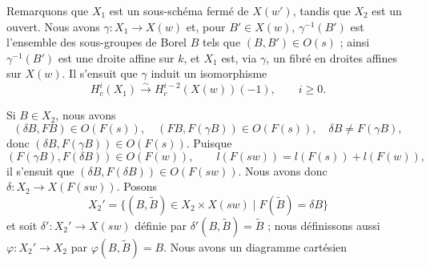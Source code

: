 \documentclass[9pt,twoside]{extarticle}
\begin{document}
{Remarquons que \(X_1\) est un sous-schéma fermé de \(X(w')\), tandis que \(X_2\) est un ouvert. Nous avons \(\gamma:X_1\to X(w)\) et, pour \(B'\in X(w)\), \(\gamma^{-1}(B')\) est l'ensemble des sous-groupes de Borel \(B\) tels que \((B,B')\in O(s)\) ; ainsi \(\gamma^{-1}(B')\) est une droite affine sur \(k\), et \(X_1\) est, via \(\gamma\), un fibré en droites affines sur \(X(w)\). Il s'ensuit que \(\gamma\) induit un isomorphisme \[
\tag{1.6.1}
H_c^i(X_1)\xrightarrow{\sim}H_c^{i-2}(X(w))(-1),\qquad i\ge 0.
\]\par

Si \(B\in X_2\), nous avons \[
(\delta B,FB)\in O(F(s)),\quad (FB,F(\gamma B))\in O(F(s)),\quad \delta B\ne F(\gamma B),
\] donc \((\delta B,F(\gamma B))\in O(F(s))\). Puisque \[
(F(\gamma B),F(\delta B))\in O(F(w)),\qquad l(F(sw))=l(F(s))+l(F(w)),
\] il s'ensuit que \((\delta B,F(\delta B))\in O(F(sw))\). Nous avons donc \(\delta:X_2\to X(F(sw))\). Posons \[
X_2'=\{(B,\widetilde B)\in X_2\times X(sw)\mid F(\widetilde B)=\delta B\}
\] et soit \(\delta':X_2'\to X(sw)\) définie par \(\delta'(B,\widetilde B)=\widetilde B\) ; nous définissons aussi \(\varphi:X_2'\to X_2\) par \(\varphi(B,\widetilde B)=B\). Nous avons un diagramme cartésien\par
}
\end{document}
